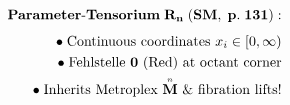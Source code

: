 \documentclass[preview]{standalone}
\begin{document}
\begin{align*}
\special{dvisvgm:raw <g id='unique000'>}\mathbf{Parameter\text{-}Tensorium\;R_n\;(SM,\;p.\;131):}\\[4pt]\bullet\;\text{Continuous coordinates }x_i\in[0,\infty)\\\bullet\;\text{Fehlstelle }\mathbf{0}\text{ (Red) at octant corner}\\\bullet\;\text{Inherits Metroplex }\overset{\scriptscriptstyle n}{\mathbf{M}}\text{ \& fibration lifts!}\special{dvisvgm:raw </g>}
\end{align*}
\end{document}
